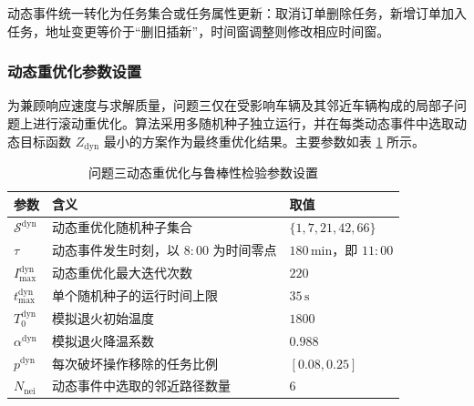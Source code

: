 \documentclass[withoutpreface,bwprint]{cumcmthesis} %
\begin{document}
动态事件统一转化为任务集合或任务属性更新：取消订单删除任务，新增订单加入任务，地址变更等价于“删旧插新”，时间窗调整则修改相应时间窗。

\subsubsection{动态重优化参数设置}

为兼顾响应速度与求解质量，问题三仅在受影响车辆及其邻近车辆构成的局部子问题上进行滚动重优化。算法采用多随机种子独立运行，并在每类动态事件中选取动态目标函数 $Z_{\mathrm{dyn}}$ 最小的方案作为最终重优化结果。主要参数如表 \ref{tab:dynamic_parameters} 所示。

\begin{table}[!htbp]
\centering
\caption{问题三动态重优化与鲁棒性检验参数设置}
\label{tab:dynamic_parameters}
\small
\renewcommand{\arraystretch}{1.20}
\setlength{\tabcolsep}{4pt}

\begin{tabular}{
>{\centering\arraybackslash}p{2.2cm}
>{\raggedright\arraybackslash}p{9.0cm}
>{\centering\arraybackslash}p{3.0cm}}
\toprule
\rowcolor{tablehead}
\textbf{参数} & \centering\textbf{含义} & \textbf{取值} \\
\midrule

$\mathcal{S}^{\mathrm{dyn}}$ 
& 动态重优化随机种子集合 
& $\{1,7,21,42,66\}$ \\

\rowcolor{tablerow}
$\tau$ 
& 动态事件发生时刻，以 $8{:}00$ 为时间零点 
& $180\,\mathrm{min}$，即 $11{:}00$ \\

$I_{\max}^{\mathrm{dyn}}$ 
& 动态重优化最大迭代次数 
& $220$ \\

\rowcolor{tablerow}
$t_{\max}^{\mathrm{dyn}}$ 
& 单个随机种子的运行时间上限 
& $35\,\mathrm{s}$ \\

$T_0^{\mathrm{dyn}}$ 
& 模拟退火初始温度 
& $1800$ \\

\rowcolor{tablerow}
$\alpha^{\mathrm{dyn}}$ 
& 模拟退火降温系数 
& $0.988$ \\

$p^{\mathrm{dyn}}$ 
& 每次破坏操作移除的任务比例 
& $[0.08,0.25]$ \\

\rowcolor{tablerow}
$N_{\mathrm{nei}}$ 
& 动态事件中选取的邻近路径数量 
& $6$ \\


\end{tabular}
\end{table}
\end{document}

